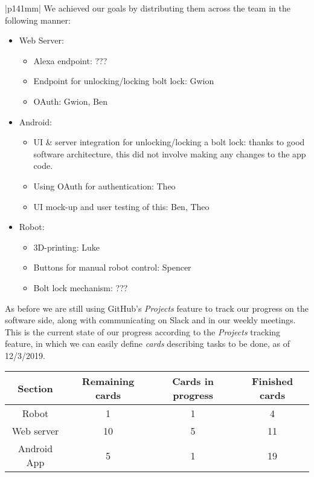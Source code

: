 \documentclass[a4paper]{article}
\newcommand{\colWidth}{141mm}
\begin{document}
\begin{center}
\begin{tabular}{|p{\colWidth}|}
		We achieved our goals by distributing them across the team in the following manner:
		\begin{itemize}
			\item Web Server:
				\begin{itemize}
					\item Alexa endpoint: {\color{red} ???}
					\item Endpoint for unlocking/locking bolt lock: Gwion
					\item OAuth: Gwion, Ben
				\end{itemize}
			\item Android:
				\begin{itemize}
					\item UI \& server integration for unlocking/locking a bolt lock: thanks to good software architecture, this did not involve making any changes to the app code.
					\item Using OAuth for authentication: Theo
					\item UI mock-up and user testing of this: Ben, Theo
				\end{itemize}
			\item Robot:
			\begin{itemize}
				\item 3D-printing: Luke
				\item Buttons for manual robot control: Spencer
				\item Bolt lock mechanism: {\color{red} ???}
			\end{itemize}
		\end{itemize}

		As before we are still using GitHub's \textit{Projects} feature to track our progress on the software side, along with communicating on Slack and in our weekly meetings.
		This is the current state of our progress according to the \textit{Projects} tracking feature, in which
		we can easily define \textit{cards} describing tasks to be done, as of 12/3/2019.
		
		\vspace{3mm}
		
		\begin{tabular}{| c || c | c | c |} \hline
			\textbf{Section} & \textbf{Remaining cards} & \textbf{Cards in progress} & \textbf{Finished cards}\\ \hline
			Robot & 1 & 1 & 4 \\
			Web server & 10 & 5 & 11 \\
			Android App & 5 & 1 & 19 \\ \hline
		\end{tabular}


\end{tabular}
\end{center}
\end{document}
